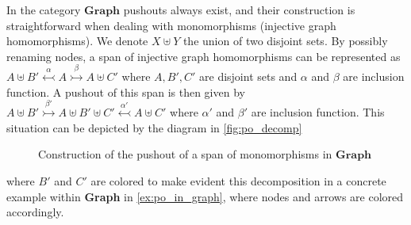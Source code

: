 In the category \(\mathbf{Graph}\) pushouts always exist, and their construction is straightforward when dealing with monomorphisms (injective graph homomorphisms). 
We denote $X\uplus Y$ the union of two disjoint sets. By possibly renaming nodes, a span of injective graph homomorphisms can be represented as
$
A \uplus B' \overset{\alpha}{\leftarrowtail} A \overset{\beta}{\rightarrowtail} A \uplus C'
$
where $A,B',C'$ are disjoint sets and $\alpha$ and $\beta$ are inclusion function. A pushout of this span is then given by
$
A \uplus B'  \overset{\beta'}{\rightarrowtail} A \uplus B' \uplus C'   \overset{\alpha'}{\leftarrowtail} A \uplus C'
$ where $\alpha'$ and $\beta'$ are inclusion function. This situation can be depicted by the diagram in \autoref{fig:po_decomp}
\begin{figure}[htbp] 
    \begin{center}
    \end{center}
    
    \caption{Construction of the pushout of a span of monomorphisms in \(\mathbf{Graph}\)}
    \label{fig:po_decomp}
\end{figure}
where \(B'\) and \(C'\) are colored to make evident this decomposition in a concrete example within \textbf{Graph} in \autoref{ex:po_in_graph}, where nodes and arrows are colored accordingly.
